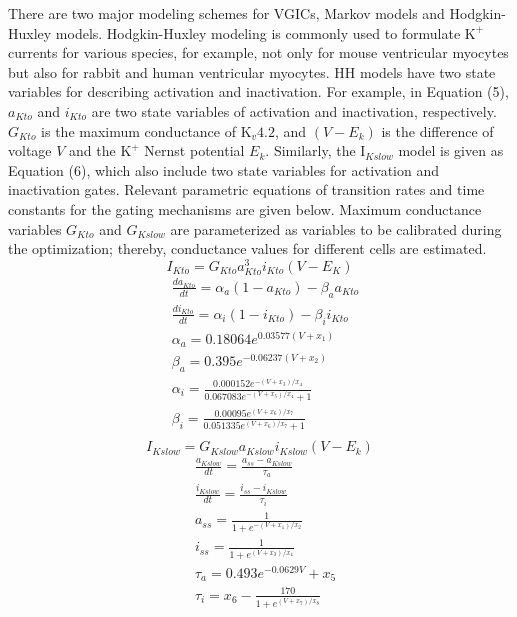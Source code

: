 \documentclass[10pt,letterpaper]{article}
\begin{document}
There are two major modeling schemes for VGICs, Markov models and Hodgkin-Huxley models. Hodgkin-Huxley modeling is commonly used to formulate $\text{K}^{+}$ currents for various species, for example, not only for mouse ventricular myocytes but also for rabbit and human ventricular myocytes. HH models have two state variables for describing activation and inactivation. For example, in Equation (5), $a_{Kto}$ and $i_{Kto}$ are two state variables of activation and inactivation, respectively. $G_{Kto}$ is the maximum conductance of $\text{K}_{v}4.2$, and $(V-E_k)$ is the difference of voltage $V$ and the $\text{K}^{+}$ Nernst potential $E_k$. Similarly, the $\text{I}_{Kslow}$ model is given as Equation (6), which also include two state variables for activation and inactivation gates. Relevant parametric equations of transition rates and time constants for the gating mechanisms are given below. Maximum conductance variables $G_{Kto}$ and $G_{Kslow}$ are parameterized as variables to be calibrated during the optimization; thereby, conductance values for different cells are estimated.
\begin{equation}
    I_{Kto} = G_{Kto}a_{Kto}^{3}i_{Kto}(V-E_K)
\end{equation}
\begin{align*}
    &\frac{da_{Kto}}{dt} = \alpha_{a}(1-a_{Kto}) - \beta_{a}a_{Kto} \\
    & \frac{di_{Kto}}{dt} = \alpha_i(1-i_{Kto}) - \beta_i i_{Kto} \\
    &\alpha_a = 0.18064 e^{0.03577(V+x_1)} \\
    &\beta_a = 0.395 e^{-0.06237(V+x_2)} \\
    &\alpha_i = \frac{0.000152 e^{-(V+x_3)/x_4}}{0.067083 e^{-(V + x_5)/x_4} + 1} \\
    &\beta_i = \frac{0.00095 e^{(V+x_6)/x_7}}{0.051335 e^{(V+x_6)/x_7} + 1} \\
\end{align*}
\begin{equation}
    I_{Kslow} = G_{Kslow}a_{Kslow}i_{Kslow}(V-E_k)
\end{equation}
\begin{align*}
    &\frac{a_{Kslow}}{dt} = \frac{a_{ss}-a_{Kslow}}{\tau_{a}} \\
    &\frac{i_{Kslow}}{dt} = \frac{i_{ss}-i_{Kslow}}{\tau_{i}} \\
    &a_{ss} = \frac{1}{1+e^{-(V+x_1)/x_2}} \\
    &i_{ss} = \frac{1}{1+e^{(V+x_3)/x_4}} \\
    &\tau_{a} = 0.493 e^{-0.0629V}+x_5 \\
    &\tau_{i} = x_6 - \frac{170}{1+e^{(V+x_7)/x_8}}
\end{align*}
\end{document}
